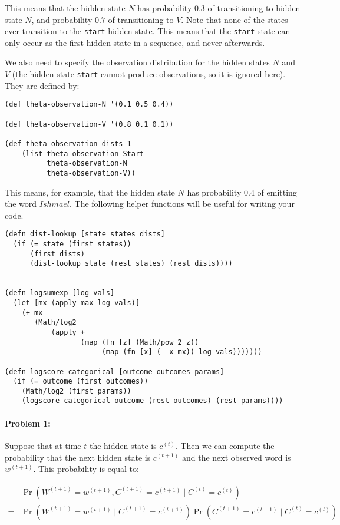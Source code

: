 \documentclass[10pt]{article}
\begin{document}
This means that the hidden state $N$ has probability $0.3$
of transitioning to hidden state $N$, and probability $0.7$ of
transitioning to $V$. Note that none of the states ever transition to
the \texttt{start} hidden state. This means that the \texttt{start}
state can only occur as the first hidden state in a sequence, and
never afterwards.

We also need to specify the observation distribution for the hidden
states $N$ and $V$ (the hidden state \texttt{start} cannot produce
observations, so it is ignored here). They are defined by:

\begin{lstlisting}
(def theta-observation-N '(0.1 0.5 0.4))

(def theta-observation-V '(0.8 0.1 0.1))

(def theta-observation-dists-1
    (list theta-observation-Start 
          theta-observation-N 
          theta-observation-V))
\end{lstlisting}


This means, for example, that the hidden state $N$ has probability
$0.4$ of emitting the word $Ishmael$. The following helper functions
will be useful for writing your code.

\begin{lstlisting}
(defn dist-lookup [state states dists]
  (if (= state (first states))
      (first dists)
      (dist-lookup state (rest states) (rest dists))))
  

(defn logsumexp [log-vals]
  (let [mx (apply max log-vals)]
    (+ mx
       (Math/log2
           (apply +
                  (map (fn [z] (Math/pow 2 z))
                       (map (fn [x] (- x mx)) log-vals)))))))

(defn logscore-categorical [outcome outcomes params]
  (if (= outcome (first outcomes))
    (Math/log2 (first params))
    (logscore-categorical outcome (rest outcomes) (rest params))))
\end{lstlisting}


\hrulefill
\paragraph{Problem 1:}

Suppose that at time $t$ the hidden state is $c^{(t)}$. Then we can
compute the probability that the next hidden state is $c^{(t+1)}$ and
the next observed word is $w^{(t+1)}$. This probability is equal to:

\begin{align*} 
&\Pr(W^{(t+1)} = w^{(t+1)}, C^{(t+1)} =c^{(t+1)} \mid C^{(t)} = c^{(t)}) \\ 
=   &\Pr(W^{(t+1)} = w^{(t+1)} \mid C^{(t+1)}=c^{(t+1)}) \Pr(C^{(t+1)} =c^{(t+1)} \mid C^{(t)} = c^{(t)})
  \end{align*}
\end{document}

